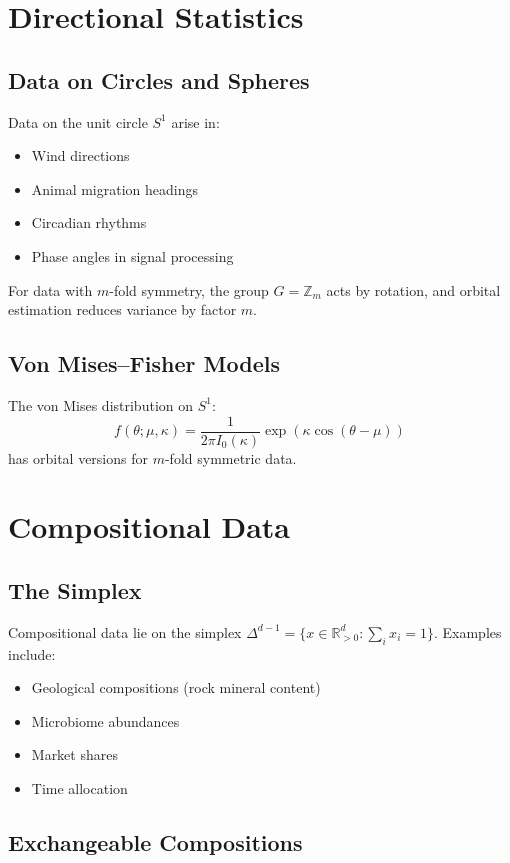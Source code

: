\documentclass[11pt,twoside,openright]{book}
\theoremstyle{plain}
\theoremstyle{definition}
\theoremstyle{remark}
\newcommand{\Rd}{\mathbb{R}}
\newcommand{\Zd}{\mathbb{Z}}
\begin{document}
\section{Directional Statistics}

\subsection{Data on Circles and Spheres}

Data on the unit circle $S^1$ arise in:
\begin{itemize}
\item Wind directions
\item Animal migration headings  
\item Circadian rhythms
\item Phase angles in signal processing
\end{itemize}

For data with $m$-fold symmetry, the group $G = \Zd_m$ acts by rotation, and orbital estimation reduces variance by factor $m$.

\subsection{Von Mises--Fisher Models}

The von Mises distribution on $S^1$:
\[
f(\theta; \mu, \kappa) = \frac{1}{2\pi I_0(\kappa)} \exp(\kappa \cos(\theta - \mu))
\]
has orbital versions for $m$-fold symmetric data.

\section{Compositional Data}

\subsection{The Simplex}

Compositional data lie on the simplex $\Delta^{d-1} = \{x \in \Rd^d_{>0} : \sum_i x_i = 1\}$. Examples include:
\begin{itemize}
\item Geological compositions (rock mineral content)
\item Microbiome abundances
\item Market shares
\item Time allocation
\end{itemize}

\subsection{Exchangeable Compositions}
\end{document}
